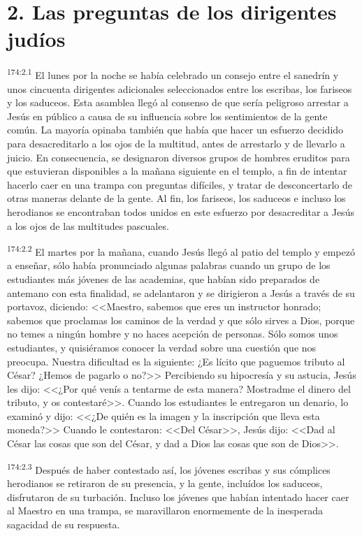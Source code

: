 \section*{2. Las preguntas de los dirigentes judíos}
\par 
\textsuperscript{174:2.1} El lunes por la noche se había celebrado un consejo entre el sanedrín y unos cincuenta dirigentes adicionales seleccionados entre los escribas, los fariseos y los saduceos. Esta asamblea llegó al consenso de que sería peligroso arrestar a Jesús en público a causa de su influencia sobre los sentimientos de la gente común. La mayoría opinaba también que había que hacer un esfuerzo decidido para desacreditarlo a los ojos de la multitud, antes de arrestarlo y de llevarlo a juicio. En consecuencia, se designaron diversos grupos de hombres eruditos para que estuvieran disponibles a la mañana siguiente en el templo, a fin de intentar hacerlo caer en una trampa con preguntas difíciles, y tratar de desconcertarlo de otras maneras delante de la gente. Al fin, los fariseos, los saduceos e incluso los herodianos se encontraban todos unidos en este esfuerzo por desacreditar a Jesús a los ojos de las multitudes pascuales.

\par 
\textsuperscript{174:2.2} El martes por la mañana, cuando Jesús llegó al patio del templo y empezó a enseñar, sólo había pronunciado algunas palabras cuando un grupo de los estudiantes más jóvenes de las academias, que habían sido preparados de antemano con esta finalidad, se adelantaron y se dirigieron a Jesús a través de su portavoz, diciendo: <<Maestro, sabemos que eres un instructor honrado; sabemos que proclamas los caminos de la verdad y que sólo sirves a Dios, porque no temes a ningún hombre y no haces acepción de personas. Sólo somos unos estudiantes, y quisiéramos conocer la verdad sobre una cuestión que nos preocupa. Nuestra dificultad es la siguiente: ¿Es lícito que paguemos tributo al César? ¿Hemos de pagarlo o no?>> Percibiendo su hipocresía y su astucia, Jesús les dijo: <<¿Por qué venís a tentarme de esta manera? Mostradme el dinero del tributo, y os contestaré>>. Cuando los estudiantes le entregaron un denario, lo examinó y dijo: <<¿De quién es la imagen y la inscripción que lleva esta moneda?>> Cuando le contestaron: <<Del César>>, Jesús dijo: <<Dad al César las cosas que son del César, y dad a Dios las cosas que son de Dios>>.

\par 
\textsuperscript{174:2.3} Después de haber contestado así, los jóvenes escribas y sus cómplices herodianos se retiraron de su presencia, y la gente, incluídos los saduceos, disfrutaron de su turbación. Incluso los jóvenes que habían intentado hacer caer al Maestro en una trampa, se maravillaron enormemente de la inesperada sagacidad de su respuesta.

